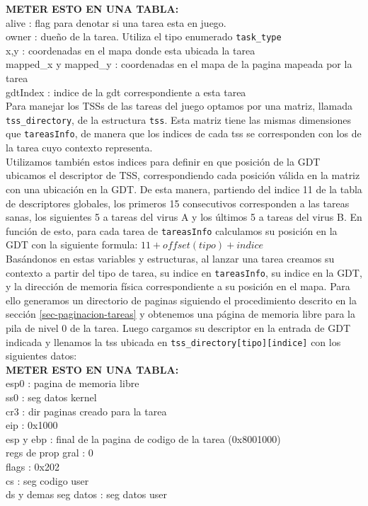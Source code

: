 \textbf{METER ESTO EN UNA TABLA:}\\
alive : flag para denotar si una tarea esta en juego. \\
owner : dueño de la tarea. Utiliza el tipo enumerado \verb|task_type|\\
x,y   : coordenadas en el mapa donde esta ubicada la tarea\\
mapped\_x y mapped\_y : coordenadas en el mapa de la pagina mapeada por la tarea\\
gdtIndex : indice de la gdt correspondiente a esta tarea\\

Para manejar los TSSs de las tareas del juego optamos por una matriz, llamada \verb|tss_directory|, de la estructura \verb|tss|. Esta matriz tiene las mismas dimensiones que \verb|tareasInfo|, de manera que los indices de cada tss se corresponden con los de la tarea cuyo contexto representa. 
\\

Utilizamos también estos indices para definir en que posición de la GDT ubicamos el descriptor de TSS, correspondiendo cada posición válida en la matriz con una ubicación en la GDT. De esta manera, partiendo del indice 11 de la tabla de descriptores globales, los primeros 15 consecutivos corresponden a las tareas sanas, los siguientes 5 a tareas del virus A y los últimos 5 a tareas del virus B.
En función de esto, para cada tarea de \verb|tareasInfo| calculamos su posición en la GDT con la siguiente formula: $ 11 + offset(tipo) + indice$\\


Basándonos en estas variables y estructuras, al lanzar una tarea creamos su contexto a partir del tipo de tarea, su indice en \verb|tareasInfo|, su indice en la GDT, y la dirección de memoria física correspondiente a su posición en el mapa. 
Para ello generamos un directorio de paginas siguiendo el procedimiento descrito en la sección \ref{sec-paginacion-tareas} y obtenemos una página de memoria libre para la pila de nivel 0 de la tarea. Luego cargamos su descriptor en la entrada de GDT indicada y llenamos la tss ubicada en \verb|tss_directory[tipo][indice]| con los siguientes datos:\\

\textbf{METER ESTO EN UNA TABLA:}\\
esp0 : pagina de memoria libre\\
ss0  : seg datos kernel\\
cr3  : dir paginas creado para la tarea\\
eip  : 0x1000\\
esp y ebp : final de la pagina de codigo de la tarea (0x8001000)\\
regs de prop gral : 0\\
flags : 0x202\\
cs : seg codigo user\\
ds y demas seg datos : seg datos user\\


